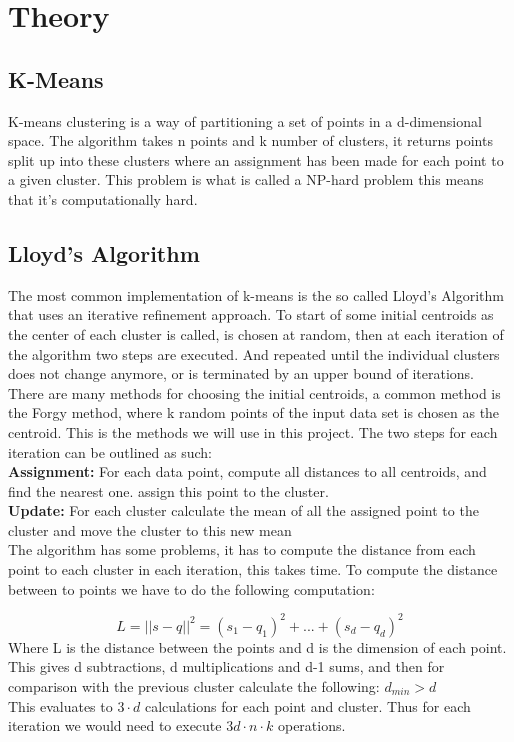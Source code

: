 \section{Theory}
\label{sec:label}

\subsection{K-Means}
\label{subsec:kmeans}

K-means clustering is a way of partitioning a set of points in a d-dimensional space. The algorithm takes n points and k number of clusters, it returns points split up into these clusters where an assignment has been made for each point to a given cluster. This problem is what is called a NP-hard problem this means that it's computationally hard.

\subsection{Lloyd's Algorithm}
\label{subsec:lloyds}

The most common implementation of k-means is the so called Lloyd's Algorithm that uses an iterative refinement approach. To start of some initial centroids as the center of each cluster is called, is chosen at random, then at each iteration of the algorithm two steps are executed. And repeated until the individual clusters does not change anymore, or is terminated by an upper bound of iterations. There are many methods for choosing the initial centroids, a common method is the Forgy method, where k random points of the input data set is chosen as the centroid. This is the methods we will use in this project. The two steps for each iteration can be outlined as such: \\

\textbf{Assignment:} For each data point, compute all distances to all centroids, and find the nearest one. assign this point to the cluster.\\
\textbf{Update:} For each cluster calculate the mean of all the assigned point to the cluster and move the cluster to this new mean\\

The algorithm has some problems, it has to compute the distance from each point to each cluster in each iteration, this takes time. To compute the distance between to points we have to do the following computation:

\begin{equation}
  L = ||s - q||^2 = (s_1 - q_1)^2 +...+(s_d - q_d)^2
\end{equation}
Where L is the distance between the points and d is the dimension of each point.
This gives d subtractions, d multiplications and d-1 sums, and then for comparison with the previous cluster calculate the following: $d_{min} > d$ \\
This evaluates to $3\cdot d$ calculations for each point and cluster. Thus for each iteration we would need to execute $3d \cdot n \cdot k$ operations.

